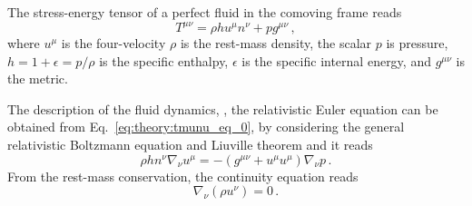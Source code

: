 The stress-energy tensor of a perfect fluid in the comoving frame 
reads 
%
\begin{equation}
T^{\mu\nu} = \rho h u^{\mu}n^{\nu} + p g^{\mu\nu}\, ,
\label{eq:theory:tmunu_perf}
\end{equation}
%
where $u^{\mu}$ is the four-velocity
$\rho$ is the rest-mass density, the scalar $p$ is pressure, 
$h = 1 + \epsilon = p/\rho$ is the specific enthalpy, 
$\epsilon$ is the specific internal energy, and $g^{\mu\nu}$ is the metric.

The description of the fluid dynamics, \ie, the relativistic Euler equation 
can be obtained from Eq.~\eqref{eq:theory:tmunu_eq_0}, 
by considering the general relativistic Boltzmann equation and Liuville theorem 
and it reads 
%
\begin{equation}
\rho h n^{\nu} \nabla_{\nu}u^{\mu} = - (g^{\mu\nu} + u^{\mu}u^{\mu})\nabla_{\nu}p\, .
\end{equation}
%
From the rest-mass conservation, the continuity equation reads 
%
\begin{equation}
\nabla_{\nu}(\rho u^{\nu}) = 0\, .
\label{eq:theory:contineq}
\end{equation}
%


